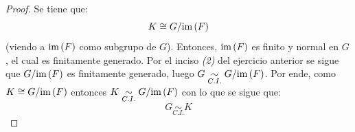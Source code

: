 \documentclass[12pt]{report}
\newcounter{it}
\theoremstyle{largebreak}
\newcommand{\qisom}{\ensuremath{\underset{C.I.}{\sim}}}
\begin{document}
    \begin{proof}
        Se tiene que:
        \begin{equation*}
            K\cong G/\textup{im}\left(F\right)
        \end{equation*}
        (viendo a $\textup{im}\left(F\right)$ como subgrupo de $G$). Entonces, $\textup{im}\left(F\right)$ es finito y normal en $G$, el cual es finitamente generado. Por el inciso \textit{(2)} del ejercicio anterior se sigue que $G/\textup{im}\left(F\right)$ es finitamente generado, luego $G\qisom G/\im{F}$. Por ende, como $K\cong G/\textup{im}\left(F\right)$ entonces $K\qisom G/\im{F}$ con lo que se sigue que:
        \begin{equation*}
            G\qisom K
        \end{equation*} 
    \end{proof}
\end{document}
